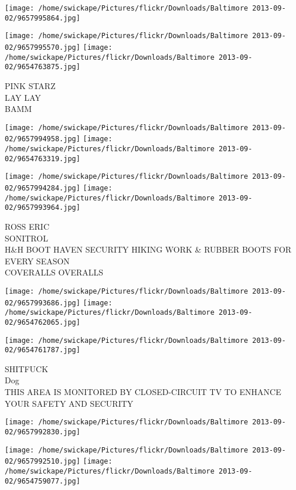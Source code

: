 \documentclass[10pt,letterpaper]{article}
\begin{document}
\texttt{[image: /home/swickape/Pictures/flickr/Downloads/Baltimore 2013-09-02/9657995864.jpg]}

\vspace{0.25in}
\texttt{[image: /home/swickape/Pictures/flickr/Downloads/Baltimore 2013-09-02/9657995570.jpg]}
\texttt{[image: /home/swickape/Pictures/flickr/Downloads/Baltimore 2013-09-02/9654763875.jpg]}

PINK STARZ\\
LAY LAY\\
BAMM\\
\pagebreak

\texttt{[image: /home/swickape/Pictures/flickr/Downloads/Baltimore 2013-09-02/9657994958.jpg]}
\texttt{[image: /home/swickape/Pictures/flickr/Downloads/Baltimore 2013-09-02/9654763319.jpg]}

\texttt{[image: /home/swickape/Pictures/flickr/Downloads/Baltimore 2013-09-02/9657994284.jpg]}
\texttt{[image: /home/swickape/Pictures/flickr/Downloads/Baltimore 2013-09-02/9657993964.jpg]}

ROSS ERIC\\
SONITROL\\
H\&H BOOT HAVEN SECURITY HIKING WORK \& RUBBER BOOTS FOR EVERY SEASON\\
COVERALLS OVERALLS\\
\pagebreak

\texttt{[image: /home/swickape/Pictures/flickr/Downloads/Baltimore 2013-09-02/9657993686.jpg]}
\texttt{[image: /home/swickape/Pictures/flickr/Downloads/Baltimore 2013-09-02/9654762065.jpg]}

\texttt{[image: /home/swickape/Pictures/flickr/Downloads/Baltimore 2013-09-02/9654761787.jpg]}

SHITFUCK\\
Dog\\
THIS AREA IS MONITORED BY CLOSED{-}CIRCUIT TV TO ENHANCE YOUR SAFETY AND SECURITY\\
\pagebreak

\texttt{[image: /home/swickape/Pictures/flickr/Downloads/Baltimore 2013-09-02/9657992830.jpg]}

\vspace{0.25in}
\texttt{[image: /home/swickape/Pictures/flickr/Downloads/Baltimore 2013-09-02/9657992510.jpg]}
\texttt{[image: /home/swickape/Pictures/flickr/Downloads/Baltimore 2013-09-02/9654759077.jpg]}
\end{document}
